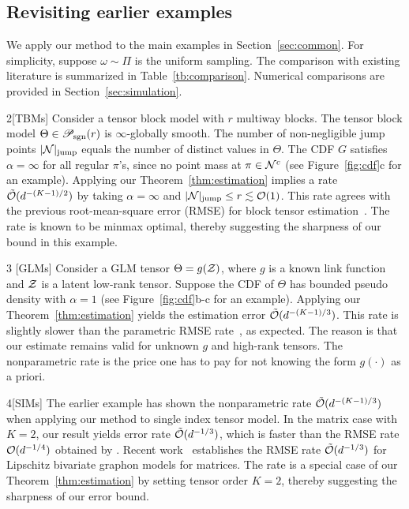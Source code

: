 \documentclass[twoside,11pt]{article}
\theoremstyle{definition}
\def\caliP{\mathscr{P}_{\textup{sgn}}}
\begin{document}
\subsection{Revisiting earlier examples}
We apply our method to the main examples in Section~\ref{sec:common}. For simplicity, suppose $\omega\sim \Pi$ is the uniform sampling. The comparison with existing literature is summarized in Table~\ref{tb:comparison}. Numerical comparisons are provided in Section~\ref{sec:simulation}. 

\begin{customexample}{2}[TBMs]
Consider a tensor block model with $r$ multiway blocks. The tensor block model $\Theta\in \caliP(r)$ is $\infty$-globally smooth. The number of non-negligible jump points $|\mathcal{N}|_{\text{jump}}$ equals the number of distinct values in $\Theta$. The CDF $G$ satisfies $\alpha= \infty$ for all regular $\pi$'s, since no point mass at $\pi\in \mathcal{N}^c$ (see Figure~\ref{fig:cdf}c for an example). Applying our Theorem~\ref{thm:estimation} implies a rate $\tilde {\mathcal{O}}(d^{-(K-1)/2})$ by taking $\alpha=\infty$ and $|\mathcal{N}|_{\text{jump}} \leq r\lesssim \mathcal{O}(1)$. This rate agrees with the  previous root-mean-square error (RMSE) for block tensor estimation~\citep{wang2019multiway}. The rate is known to be minmax optimal, thereby suggesting the sharpness of our bound in this example. 
\end{customexample}

\begin{customexample}{3} [GLMs] 
Consider a GLM tensor $\Theta=g(\mathcal{Z})$, where $g$ is a known link function and $\mathcal{Z}$ is a latent low-rank tensor. Suppose the CDF of $\Theta$ has bounded pseudo density with $\alpha=1$ (see Figure~\ref{fig:cdf}b-c for an example). Applying our Theorem~\ref{thm:estimation} yields the estimation error $\tilde {\mathcal{O}}(d^{-(K-1)/3})$. This rate is slightly slower than the parametric RMSE rate~\citep{zhang2018tensor,wang2018learning}, as expected. The reason is that our estimate remains valid for unknown $g$ and high-rank tensors. The nonparametric rate is the price one has to pay for not knowing the form $g(\cdot)$ as a priori. 
\end{customexample}

\begin{customexample}{4}[SIMs]
The earlier example has shown the nonparametric rate $\tilde {\mathcal{O}}(d^{-(K-1)/3})$ when applying our method to single index tensor model. In the matrix case with $K=2$, our result yields error rate $\tilde {\mathcal{O}}(d^{-1/3})$, which is faster than the RMSE rate $\mathcal{O}(d^{-1/4})$ obtained by \cite{ganti2015matrix}. Recent work~\citep{xu2018rates} establishes the RMSE rate $\tilde {\mathcal{O}}(d^{-1/3})$ for Lipschitz bivariate graphon models for matrices.  The rate is a special case of our Theorem~\ref{thm:estimation} by setting tensor order $K=2$, thereby suggesting the sharpness of our error bound. 
\end{customexample}
\end{document}
